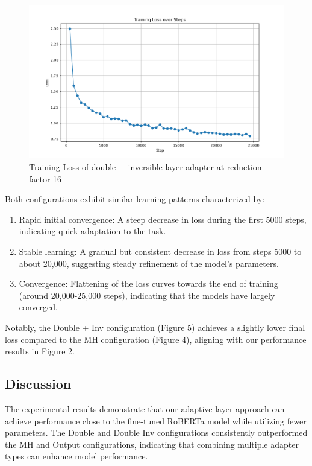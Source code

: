 \documentclass[conference]{IEEEtran}
\begin{document}
\begin{figure}
    \centering
    \includegraphics[width=1.0\linewidth]{images/loss_double_seq_bn_inv_default.png}
    \caption{Training Loss of double + inversible layer adapter at reduction factor 16}
    \label{fig:Training loss of double + inversible layer adapter at reduction factor 16}
\end{figure}

Both configurations exhibit similar learning patterns characterized by:

\begin{enumerate}
    \item Rapid initial convergence: A steep decrease in loss during the first 5000 steps, indicating quick adaptation to the task.
    \item Stable learning: A gradual but consistent decrease in loss from steps 5000 to about 20,000, suggesting steady refinement of the model's parameters.
    \item Convergence: Flattening of the loss curves towards the end of training (around 20,000-25,000 steps), indicating that the models have largely converged.
\end{enumerate}

Notably, the Double + Inv configuration (Figure 5) achieves a slightly lower final loss compared to the MH configuration (Figure 4), aligning with our performance results in Figure 2.

\subsection{Discussion}

The experimental results demonstrate that our adaptive layer approach can achieve performance close to the fine-tuned RoBERTa model while utilizing fewer parameters. The Double and Double Inv configurations consistently outperformed the MH and Output configurations, indicating that combining multiple adapter types can enhance model performance.
\end{document}
